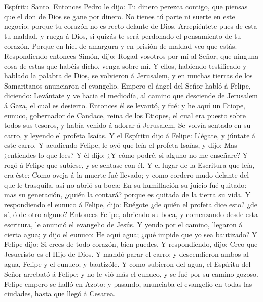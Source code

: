 Espíritu Santo.  Entonces Pedro le dijo: Tu dinero
perezca contigo, que piensas que el don de Dios se gane por dinero.
 No tienes tú parte ni suerte en este negocio; porque tu
corazón no es recto delante de Dios.  Arrepiéntete pues
de esta tu maldad, y ruega á Dios, si quizás te será perdonado el
pensamiento de tu corazón.  Porque en hiel de amargura y
en prisión de maldad veo que estás.  Respondiendo
entonces Simón, dijo: Rogad vosotros por mí al Señor, que ninguna cosa
de estas que habéis dicho, venga sobre mí.  Y ellos,
habiendo testificado y hablado la palabra de Dios, se volvieron á
Jerusalem, y en muchas tierras de los Samaritanos anunciaron el
evangelio.  Empero el ángel del Señor habló á Felipe,
diciendo: Levántate y ve hacia el mediodía, al camino que desciende de
Jerusalem á Gaza, el cual es desierto.  Entonces él se
levantó, y fué: y he aquí un Etiope, eunuco, gobernador de Candace,
reina de los Etiopes, el cual era puesto sobre todos sus tesoros, y
había venido á adorar á Jerusalem,  Se volvía sentado en
su carro, y leyendo el profeta Isaías.  Y el Espíritu
dijo á Felipe: Llégate, y júntate á este carro.  Y
acudiendo Felipe, le oyó que leía el profeta Isaías, y dijo: Mas
¿entiendes lo que lees?  Y él dijo: ¿Y cómo podré, si
alguno no me enseñare? Y rogó á Felipe que subiese, y se sentase con él.
 Y el lugar de la Escritura que leía, era éste: Como
oveja á la muerte fué llevado; y como cordero mudo delante del que le
trasquila, así no abrió su boca:  En su humillación su
juicio fué quitado: mas su generación, ¿quién la contará? porque es
quitada de la tierra su vida.  Y respondiendo el eunuco á
Felipe, dijo: Ruégote ¿de quién el profeta dice esto? ¿de sí, ó de otro
alguno?  Entonces Felipe, abriendo su boca, y comenzando
desde esta escritura, le anunció el evangelio de Jesús. 
Y yendo por el camino, llegaron á cierta agua; y dijo el eunuco: He aquí
agua; ¿qué impide que yo sea bautizado?  Y Felipe dijo:
Si crees de todo corazón, bien puedes. Y respondiendo, dijo: Creo que
Jesucristo es el Hijo de Dios.  Y mandó parar el carro: y
descendieron ambos al agua, Felipe y el eunuco; y bautizóle.
 Y como subieron del agua, el Espíritu del Señor arrebató
á Felipe; y no le vió más el eunuco, y se fué por su camino gozoso.
 Felipe empero se halló en Azoto: y pasando, anunciaba el
evangelio en todas las ciudades, hasta que llegó á Cesarea.

